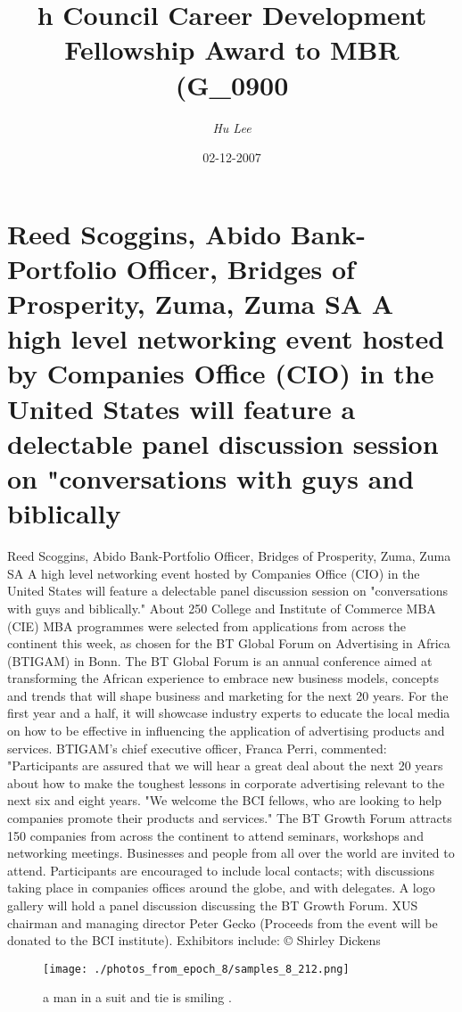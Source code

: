 \documentclass{article}%
\title{h Council Career Development Fellowship Award to MBR (G\_0900}%
\author{\textit{Hu Lee}}%
\date{02-12-2007}%
\begin{document}
%
\normalsize%
\maketitle%
\section{Reed Scoggins, Abido Bank{-}Portfolio Officer, Bridges of Prosperity, Zuma, Zuma SA\newline%
A high level networking event hosted by Companies Office (CIO) in the United States will feature a delectable panel discussion session on "conversations with guys and biblically}%
\label{sec:ReedScoggins,AbidoBank{-}PortfolioOfficer,BridgesofProsperity,Zuma,ZumaSAAhighlevelnetworkingeventhostedbyCompaniesOffice(CIO)intheUnitedStateswillfeatureadelectablepaneldiscussionsessiononconversationswithguysandbiblically}%
Reed Scoggins, Abido Bank{-}Portfolio Officer, Bridges of Prosperity, Zuma, Zuma SA\newline%
A high level networking event hosted by Companies Office (CIO) in the United States will feature a delectable panel discussion session on "conversations with guys and biblically."\newline%
About 250 College and Institute of Commerce MBA (CIE) MBA programmes were selected from applications from across the continent this week, as chosen for the BT Global Forum on Advertising in Africa (BTIGAM) in Bonn.\newline%
The BT Global Forum is an annual conference aimed at transforming the African experience to embrace new business models, concepts and trends that will shape business and marketing for the next 20 years.\newline%
For the first year and a half, it will showcase industry experts to educate the local media on how to be effective in influencing the application of advertising products and services.\newline%
BTIGAM's chief executive officer, Franca Perri, commented: "Participants are assured that we will hear a great deal about the next 20 years about how to make the toughest lessons in corporate advertising relevant to the next six and eight years.\newline%
"We welcome the BCI fellows, who are looking to help companies promote their products and services."\newline%
The BT Growth Forum attracts 150 companies from across the continent to attend seminars, workshops and networking meetings. Businesses and people from all over the world are invited to attend. Participants are encouraged to include local contacts; with discussions taking place in companies offices around the globe, and with delegates.\newline%
A logo gallery will hold a panel discussion discussing the BT Growth Forum. XUS chairman and managing director Peter Gecko (Proceeds from the event will be donated to the BCI institute).\newline%
Exhibitors include:\newline%
© Shirley Dickens\newline%

%


\begin{figure}[h!]%
\centering%
\texttt{[image: ./photos\_from\_epoch\_8/samples\_8\_212.png]}%
\caption{a man in a suit and tie is smiling .}%
\end{figure}

%
\end{document}
